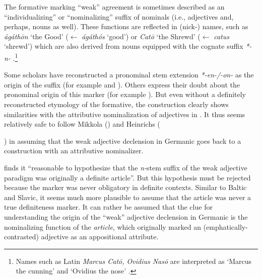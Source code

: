 The  formative marking “weak” agreement is sometimes described as an “individualizing” or “nominalizing” suffix of nominals (i.e., adjectives and, perhaps, nouns as well). These functions are reflected in (nick-) names, such as  \textit{ágáthōn} ‘the Good’ ($\leftarrow$ \textit{ágáthós} ‘good’) or  \textit{Catō} ‘the Shrewd’ ($\leftarrow$ \textit{catus} ‘shrewd’) which are also derived from nouns equipped with the cognate suffix \textit{*-n-} \citep[170]{ringe2006}.\footnote{Names such as Latin \textit{Marcus Catō, Ovidius Nasō} are interpreted as ‘Marcus the cunning’ and ‘Ovidius the nose’ \citep[6–7]{nocentini1996}.}

Some scholars have reconstructed a pronominal stem extension \textit{*-en-/-on-} as the origin of the suffix (for example \citealt[52]{mikkola1950} and \citealt[67]{heinrichs1954}). Others express their doubt about the pronominal origin of this marker (for example \citealt[21 Footnote 6]{schmidt1959}). But even without a definitely reconstructed etymology of the formative, the construction clearly shows similarities with the attributive nominalization of adjectives in . It thus seems relatively safe to follow Mikkola (\citeyear{mikkola1950}) and Heinrichs ({\citeyear{heinrichs1954}) in assuming that the weak adjective declension in Germanic goes back to a construction with an attributive nominalizer.

\citet[170]{ringe2006} finds it “reasonable to hypothesize that the \textit{n-}stem suffix of the weak adjective paradigm was originally a definite article”. But this hypothesis must be rejected because the marker was never obligatory in definite contexts. Similar to Baltic and Slavic, it seems much more plausible to assume that the article was never a true definiteness marker. It can rather be assumed that the clue for understanding the origin of the “weak” adjective declension in Germanic is the nominalizing function of the \textit{article}, which originally marked an (emphatically-contrasted) adjective as an appositional attribute.

}
